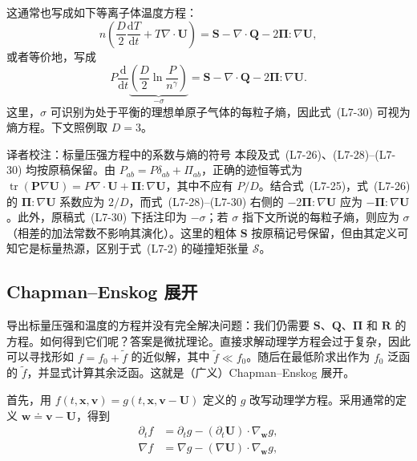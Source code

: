 这通常也写成如下等离子体温度方程：
\begin{equation}
n\left(\frac D2\frac{\mathrm dT}{\mathrm dt}+T\nabla\cdot\boldsymbol U\right)
=\boldsymbol S-\nabla\cdot\boldsymbol Q-2\boldsymbol\Pi:\nabla\boldsymbol U,
\tag{L7-29}\label{eq:L7:29}
\end{equation}
或者等价地，写成
\begin{equation}
P\frac{\mathrm d}{\mathrm dt}\underbrace{\left(\frac D2\ln\frac P{n^\gamma}\right)}_{-\sigma}
=\boldsymbol S-\nabla\cdot\boldsymbol Q-2\boldsymbol\Pi:\nabla\boldsymbol U.
\tag{L7-30}\label{eq:L7:30}
\end{equation}
这里，$\sigma$ 可识别为处于平衡的理想单原子气体的每粒子熵，因此式~(L7-30) 可视为熵方程。下文照例取 $D=3$。
\begin{correction}{译者校注：标量压强方程中的系数与熵的符号}
本段及式~(L7-26)、(L7-28)--(L7-30) 均按原稿保留。由 $P_{ab}=P\delta_{ab}+\Pi_{ab}$，正确的迹恒等式为 $\operatorname{tr}(\boldsymbol P\nabla\boldsymbol U)=P\nabla\cdot\boldsymbol U+\boldsymbol\Pi:\nabla\boldsymbol U$，其中不应有 $P/D$。结合式~(L7-25)，式~(L7-26) 的 $\boldsymbol\Pi:\nabla\boldsymbol U$ 系数应为 $2/D$，而式~(L7-28)--(L7-30) 右侧的 $-2\boldsymbol\Pi:\nabla\boldsymbol U$ 应为 $-\boldsymbol\Pi:\nabla\boldsymbol U$。此外，原稿式~(L7-30) 下括注印为 $-\sigma$；若 $\sigma$ 指下文所说的每粒子熵，则应为 $\sigma$（相差的加法常数不影响其演化）。这里的粗体 $\boldsymbol S$ 按原稿记号保留，但由其定义可知它是标量热源，区别于式~(L7-2) 的碰撞矩张量 $\boldsymbol{\mathcal S}$。
\end{correction}

\subsection{Chapman--Enskog 展开}
导出标量压强和温度的方程并没有完全解决问题：我们仍需要 $\boldsymbol S$、$\boldsymbol Q$、$\boldsymbol\Pi$ 和 $\boldsymbol R$ 的方程。如何得到它们呢？答案是微扰理论。直接求解动理学方程会过于复杂，因此可以寻找形如 $f=f_0+\widetilde f$ 的近似解，其中 $\widetilde f\ll f_0$。随后在最低阶求出作为 $f_0$ 泛函的 $\widetilde f$，并显式计算其余泛函。这就是（广义）Chapman--Enskog 展开。

首先，用 $f(t,\boldsymbol x,\boldsymbol v)=g(t,\boldsymbol x,\boldsymbol v-\boldsymbol U)$ 定义的 $g$ 改写动理学方程。采用通常的定义 $\boldsymbol w\doteq\boldsymbol v-\boldsymbol U$，得到
\begin{align}
\partial_tf&=\partial_tg-(\partial_t\boldsymbol U)\cdot\nabla_{\boldsymbol w}g,
\tag{L7-31a}\label{eq:L7:31a}\\
\nabla f&=\nabla g-(\nabla\boldsymbol U)\cdot\nabla_{\boldsymbol w}g,
\tag{L7-31b}\label{eq:L7:31b}
\end{align}
